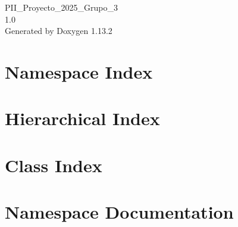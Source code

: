 \documentclass[twoside]{book}
\newcommand{\+}{\discretionary{\mbox{\scriptsize$\hookleftarrow$}}{}{}}
\newcommand{\clearemptydoublepage}{%
    \newpage{\pagestyle{empty}\cleardoublepage}%
  }
\begin{document}
  \raggedbottom
    \hypersetup{pageanchor=false,
                bookmarksnumbered=true,
                pdfencoding=unicode
               }
  \begin{titlepage}
  \vspace*{7cm}
  \begin{center}%
  {\Large PII\+\_\+\+Proyecto\+\_\+2025\+\_\+\+Grupo\+\_\+3}\\
  [1ex]\large 1.\+0 \\
  \vspace*{1cm}
  {\large Generated by Doxygen 1.13.2}\\
  \end{center}
  \end{titlepage}
  \clearemptydoublepage
  \tableofcontents
  \clearemptydoublepage
  \hypersetup{pageanchor=true}

\chapter{Namespace Index}

\chapter{Hierarchical Index}

\chapter{Class Index}

\chapter{Namespace Documentation}










\end{document}

